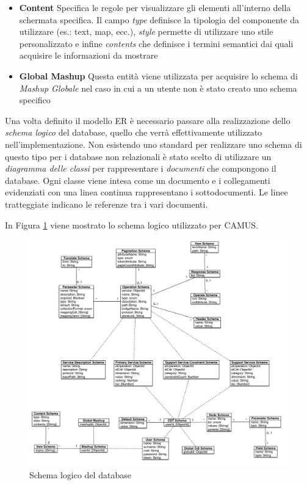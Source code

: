 \begin{itemize}
	\item \textbf{Content}
	Specifica le regole per visualizzare gli elementi all'interno della schermata specifica. Il campo \emph{type} definisce la tipologia del componente da utilizzare (es.: text, map, ecc.), \emph{style} permette di utilizzare uno stile personalizzato e infine \emph{contents} che definisce i termini semantici dai quali acquisire le informazioni da mostrare
	\item \textbf{Global Mashup}
	Questa entità viene utilizzata per acquisire lo schema di \emph{Mashup Globale} nel caso in cui a un utente non è stato creato uno schema specifico
\end{itemize}

Una volta definito il modello ER è necessario passare alla realizzazione dello \emph{schema logico} del database, quello che verrà effettivamente utilizzato nell'implementazione. Non esistendo uno standard per realizzare uno schema di questo tipo per i database non relazionali è stato scelto di utilizzare un \emph{diagramma delle classi} per rappresentare i \emph{documenti} che compongono il database. Ogni classe viene intesa come un documento e i collegamenti evidenziati con una linea continua rappresentano i sottodocumenti. Le linee tratteggiate indicano le referenze tra i vari documenti.

In Figura \ref{fig:schema-logico-db} viene mostrato lo schema logico utilizzato per CAMUS.

\begin{figure}[ht]
	\centering
	\includegraphics[width=\textwidth]{5-implementazione-backend/Immagini/schema_logico_db.png}
	\caption{Schema logico del database}\label{fig:schema-logico-db}
\end{figure}

